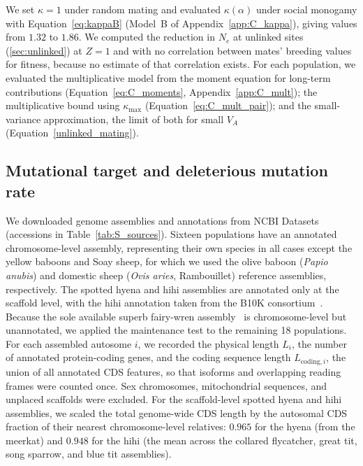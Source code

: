 \documentclass{article}
\begin{document}
We set $\kappa = 1$ under random mating and evaluated $\kappa(\alpha)$ under social monogamy with Equation~\eqref{eq:kappaB} (Model~B of Appendix~\ref{app:C_kappa}), giving values from $1.32$ to $1.86$. We computed the reduction in $N_e$ at unlinked sites (\autoref{sec:unlinked}) at $Z = 1$ and with no correlation between mates' breeding values for fitness, because no estimate of that correlation exists. For each population, we evaluated the multiplicative model from the moment equation for long-term contributions (Equation~\eqref{eq:C_moments}, Appendix~\ref{app:C_mult}); the multiplicative bound using $\kappa_\text{max}$ (Equation~\eqref{eq:C_mult_pair}); and the small-variance approximation, the limit of both for small $V_A$ (Equation~\eqref{unlinked_mating}).

\subsection{Mutational target and deleterious mutation rate}\label{sec:meth_ud}
We downloaded genome assemblies and annotations from NCBI Datasets (accessions in Table~\ref{tab:S_sources}). Sixteen populations have an annotated chromosome-level assembly, representing their own species in all cases except the yellow baboons and Soay sheep, for which we used the olive baboon (\emph{Papio anubis}) and domestic sheep (\emph{Ovis aries}, Rambouillet) reference assemblies, respectively. The spotted hyena and hihi assemblies are annotated only at the scaffold level, with the hihi annotation taken from the B10K consortium~\cite{feng2020}. Because the sole available superb fairy-wren assembly~\cite{penalba2020} is chromosome-level but unannotated, we applied the maintenance test to the remaining 18 populations. For each assembled autosome $i$, we recorded the physical length $L_i$, the number of annotated protein-coding genes, and the coding sequence length $L_{\text{coding},i}$, the union of all annotated CDS features, so that isoforms and overlapping reading frames were counted once. Sex chromosomes, mitochondrial sequences, and unplaced scaffolds were excluded. For the scaffold-level spotted hyena and hihi assemblies, we scaled the total genome-wide CDS length by the autosomal CDS fraction of their nearest chromosome-level relatives: $0.965$ for the hyena (from the meerkat) and $0.948$ for the hihi (the mean across the collared flycatcher, great tit, song sparrow, and blue tit assemblies).
\end{document}
